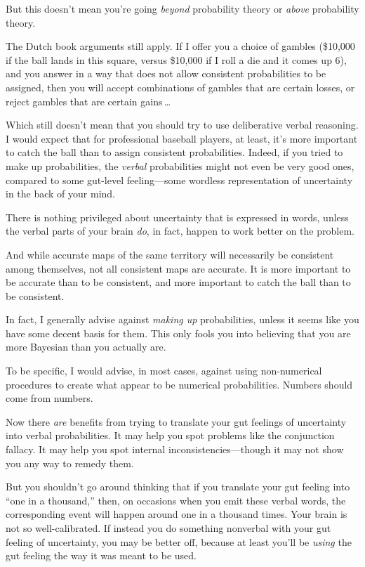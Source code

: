 But this doesn't mean you're going
\textit{beyond} probability theory or \textit{above} probability
theory.


 The Dutch book arguments still apply. If I offer you a choice of
gambles (\$10,000 if the ball lands in this square, versus \$10,000 if
I roll a die and it comes up 6), and you answer in a way that does not
allow consistent probabilities to be assigned, then you will accept
combinations of gambles that are certain losses, or reject gambles that
are certain gains\,\ldots


 Which still doesn't mean that you should try to
use deliberative verbal reasoning. I would expect that for professional
baseball players, at least, it's more important to
catch the ball than to assign consistent probabilities. Indeed, if you
tried to make up probabilities, the \textit{verbal} probabilities might
not even be very good ones, compared to some gut-level feeling---some
wordless representation of uncertainty in the back of your mind.


 There is nothing privileged about uncertainty that is expressed in
words, unless the verbal parts of your brain \textit{do}, in fact,
happen to work better on the problem.


 And while accurate maps of the same territory will necessarily be
consistent among themselves, not all consistent maps are accurate. It
is more important to be accurate than to be consistent, and more
important to catch the ball than to be consistent.


 In fact, I generally advise against \textit{making up}
probabilities, unless it seems like you have some decent basis for
them. This only fools you into believing that you are more Bayesian
than you actually are.


 To be specific, I would advise, in most cases, against using
non-numerical procedures to create what appear to be numerical
probabilities. Numbers should come from numbers.


 Now there \textit{are} benefits from trying to translate your gut
feelings of uncertainty into verbal probabilities. It may help you spot
problems like the conjunction fallacy. It may help you spot internal
inconsistencies---though it may not show you any way to remedy them.


 But you shouldn't go around thinking that if you
translate your gut feeling into ``one in a
thousand,'' then, on occasions when you emit these
verbal words, the corresponding event will happen around one in a
thousand times. Your brain is not so well-calibrated. If instead you do
something nonverbal with your gut feeling of uncertainty, you may be
better off, because at least you'll be \textit{using}
the gut feeling the way it was meant to be used.


